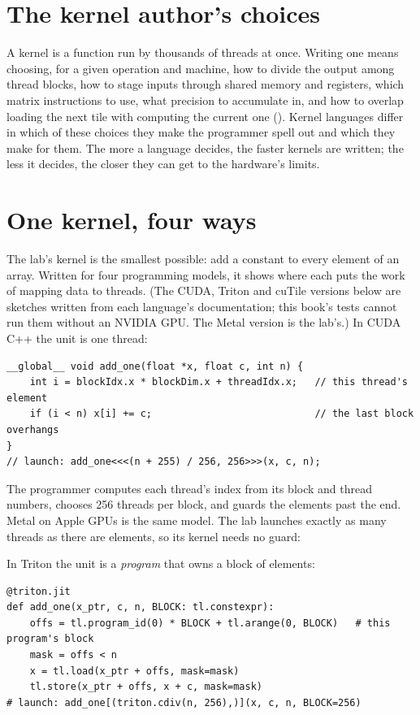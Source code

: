 \section{The kernel author's choices}

A kernel is a function run by thousands of threads at once. Writing one means
choosing, for a given operation and machine, how to divide the output among
thread blocks, how to stage inputs through shared memory and registers, which
matrix instructions to use, what precision to accumulate in, and how to
overlap loading the next tile with computing the current one
(). Kernel languages differ in which of these choices
they make the programmer spell out and which they make for them. The more a
language decides, the faster kernels are written; the less it decides, the
closer they can get to the hardware's limits.

\section{One kernel, four ways}

The lab's kernel is the smallest possible: add a constant to every element of
an array. Written for four programming models, it shows where each puts the
work of mapping data to threads. (The CUDA, Triton and cuTile versions below
are sketches written from each language's documentation; this book's tests
cannot run them without an NVIDIA GPU. The Metal version is the lab's.) In
CUDA C++ the unit is one thread:

\begin{verbatim}
__global__ void add_one(float *x, float c, int n) {
    int i = blockIdx.x * blockDim.x + threadIdx.x;   // this thread's element
    if (i < n) x[i] += c;                            // the last block overhangs
}
// launch: add_one<<<(n + 255) / 256, 256>>>(x, c, n);
\end{verbatim}

\noindent The programmer computes each thread's index from its block and thread
numbers, chooses 256 threads per block, and guards the elements past the end.
Metal on Apple GPUs is the same model. The lab launches exactly as many threads
as there are elements, so its kernel needs no guard:


\noindent In Triton the unit is a \emph{program} that owns a block of elements:

\begin{verbatim}
@triton.jit
def add_one(x_ptr, c, n, BLOCK: tl.constexpr):
    offs = tl.program_id(0) * BLOCK + tl.arange(0, BLOCK)   # this program's block
    mask = offs < n
    x = tl.load(x_ptr + offs, mask=mask)
    tl.store(x_ptr + offs, x + c, mask=mask)
# launch: add_one[(triton.cdiv(n, 256),)](x, c, n, BLOCK=256)
\end{verbatim}

